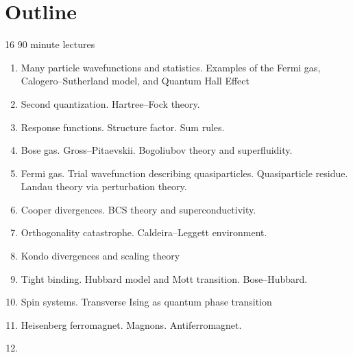 \section{Outline}

16 90 minute lectures

\begin{enumerate}
\item Many particle wavefunctions and statistics. Examples of the Fermi gas, Calogero--Sutherland model, and Quantum Hall Effect

\item Second quantization. Hartree--Fock theory.

\item Response functions. Structure factor. Sum rules. 

\item Bose gas. Gross--Pitaevskii. Bogoliubov theory and superfluidity.

\item Fermi gas. Trial wavefunction describing quasiparticles. Quasiparticle residue. Landau theory via perturbation theory. 

\item Cooper divergences. BCS theory and superconductivity. 

\item Orthogonality catastrophe. Caldeira--Leggett environment.

\item Kondo divergences and scaling theory

\item Tight binding. Hubbard model and Mott transition. Bose--Hubbard.

\item Spin systems. Transverse Ising as quantum phase transition

\item Heisenberg ferromagnet. Magnons. Antiferromagnet.

\item 
\end{enumerate}
